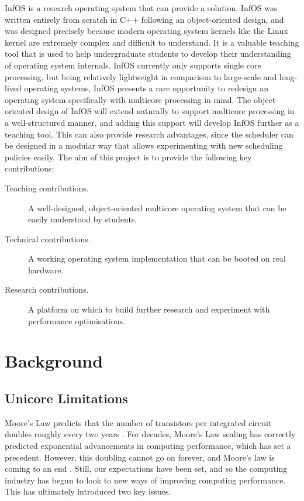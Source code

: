 \documentclass[bsc,frontabs,singlespacing,parskip,deptreport]{infthesis}
\begin{document}
InfOS \cite{infos} is a research operating system that can provide a solution. InfOS was written entirely from scratch in C++ following an object-oriented design, and was designed precisely because modern operating system kernels like the Linux kernel are extremely complex and difficult to understand. It is a valuable teaching tool that is used to help undergraduate students to develop their understanding of operating system internals. InfOS currently only supports single core processing, but being relatively lightweight in comparison to large-scale and long-lived operating systems, InfOS presents a rare opportunity to redesign an operating system specifically with multicore processing in mind. The object-oriented design of InfOS will extend naturally to support multicore processing in a well-structured manner, and adding this support will develop InfOS further as a teaching tool. This can also provide research advantages, since the scheduler can be designed in a modular way that allows experimenting with new scheduling policies easily. The aim of this project is to provide the following key contributions:

\begin{description}
    \item [Teaching contributions.] A well-designed, object-oriented multicore operating system that can be easily understood by students.
    \item [Technical contributions.] A working operating system implementation that can be booted on real hardware.
    \item [Research contributions. ] A platform on which to build further research and experiment with performance optimisations.
\end{description}

\chapter{Background}

\section{Unicore Limitations} \label{unicore-limitations}
Moore’s Law predicts that the number of transistors per integrated circuit doubles roughly every two years \cite{moore_1998} \cite{moore_2006}. For decades, Moore’s Law scaling has correctly predicted exponential advancements in computing performance, which has set a precedent. However, this doubling cannot go on forever, and Moore’s law is coming to an end \cite{DBLP:journals/cse/TheisW17}. Still, our expectations have been set, and so the computing industry has begun to look to new ways of improving computing performance. This has ultimately introduced two key issues.
\end{document}
